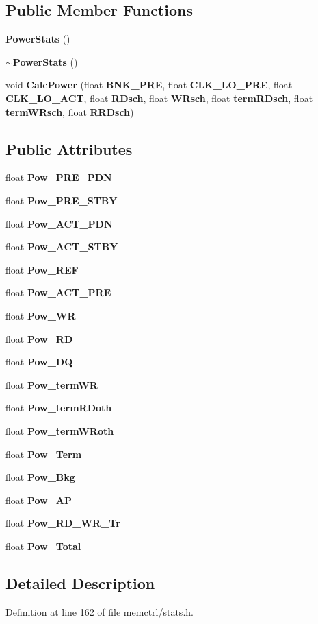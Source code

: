 \subsection*{Public Member Functions}
\begin{CompactItemize}
\item 
{\bf PowerStats} ()
\item 
{\bf $\sim$PowerStats} ()
\item 
void {\bf CalcPower} (float {\bf BNK\_\-PRE}, float {\bf CLK\_\-LO\_\-PRE}, float {\bf CLK\_\-LO\_\-ACT}, float {\bf RDsch}, float {\bf WRsch}, float {\bf termRDsch}, float {\bf termWRsch}, float {\bf RRDsch})
\end{CompactItemize}
\subsection*{Public Attributes}
\begin{CompactItemize}
\item 
float {\bf Pow\_\-PRE\_\-PDN}
\item 
float {\bf Pow\_\-PRE\_\-STBY}
\item 
float {\bf Pow\_\-ACT\_\-PDN}
\item 
float {\bf Pow\_\-ACT\_\-STBY}
\item 
float {\bf Pow\_\-REF}
\item 
float {\bf Pow\_\-ACT\_\-PRE}
\item 
float {\bf Pow\_\-WR}
\item 
float {\bf Pow\_\-RD}
\item 
float {\bf Pow\_\-DQ}
\item 
float {\bf Pow\_\-termWR}
\item 
float {\bf Pow\_\-termRDoth}
\item 
float {\bf Pow\_\-termWRoth}
\item 
float {\bf Pow\_\-Term}
\item 
float {\bf Pow\_\-Bkg}
\item 
float {\bf Pow\_\-AP}
\item 
float {\bf Pow\_\-RD\_\-WR\_\-Tr}
\item 
float {\bf Pow\_\-Total}
\end{CompactItemize}


\subsection{Detailed Description}


Definition at line 162 of file memctrl/stats.h.

